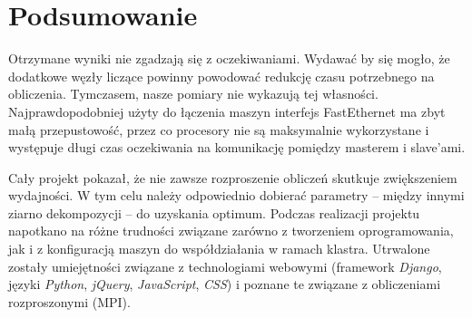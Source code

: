 \documentclass[a4paper]{article}
\begin{document}
\newpage

\section{Podsumowanie}
Otrzymane wyniki nie zgadzają się z oczekiwaniami. Wydawać by się mogło, że dodatkowe węzły liczące powinny powodować redukcję czasu potrzebnego na obliczenia. Tymczasem, nasze pomiary nie wykazują tej własności. Najprawdopodobniej użyty do łączenia maszyn interfejs FastEthernet ma zbyt małą przepustowość, przez co procesory nie są maksymalnie wykorzystane i występuje długi czas oczekiwania na komunikację pomiędzy masterem i slave'ami. 

Cały projekt pokazał, że nie zawsze rozproszenie obliczeń skutkuje zwiększeniem wydajności. W tym celu należy odpowiednio dobierać parametry -- między innymi ziarno dekompozycji -- do uzyskania optimum. Podczas realizacji projektu napotkano na różne trudności związane zarówno z tworzeniem oprogramowania, jak i z konfiguracją maszyn do współdziałania w ramach klastra. Utrwalone zostały umiejętności związane z technologiami webowymi (framework \textit{Django}, języki \textit{Python}, \textit{jQuery}, \textit{JavaScript}, \textit{CSS}) i poznane te związane z obliczeniami rozproszonymi (MPI).

\newpage
\listoffigures
{}
\end{document}
